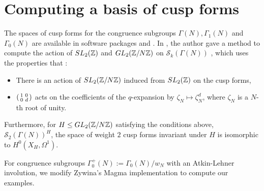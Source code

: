 \section{Computing a basis of cusp forms}\label{basis:zyinwa}

The spaces of cusp forms for the congruence subgroups $\Gamma(N), \Gamma_1(N)$ and $\Gamma_0(N)$ are available in software packages \cite{sagemath} and \cite{magma}. In \cite{Zywina2020ComputingAO}, the author gave a method to compute the action of $SL_2(\mathbb{Z})$ and $GL_2(\mathbb{Z}/N\mathbb{Z})$ on $\mathcal{S}_k(\Gamma(N))$ , which uses the properties that \cite{Brunault2020}:

\begin{itemize}
    \item There is an action of $SL_2(\mathbb{Z}/N\mathbb{Z})$ induced from $SL_2(\mathbb{Z})$ on the cusp forms,
    \item $\begin{psmallmatrix} 1 & 0 \\ 0 & d \end{psmallmatrix}$ acts on the coefficients of the $q$-expansion by $\zeta_N \mapsto \zeta_N^d$, where $\zeta_N$ is a $N$-th root of unity. 
\end{itemize}

Furthermore, for $H \leq GL_2(\mathbb{Z}/N\mathbb{Z})$ satisfying the conditions above, $\mathcal{S}_2(\Gamma(N))^H$, the space of weight $2$ cusp forms invariant under $H$ is isomorphic to $H^0(X_H,\Omega^1)$. 

For congruence subgroups $\Gamma_0^+(N) := \Gamma_0(N)/w_N$ with an Atkin-Lehner involution, we modify Zywina's Magma implementation to compute our examples.

